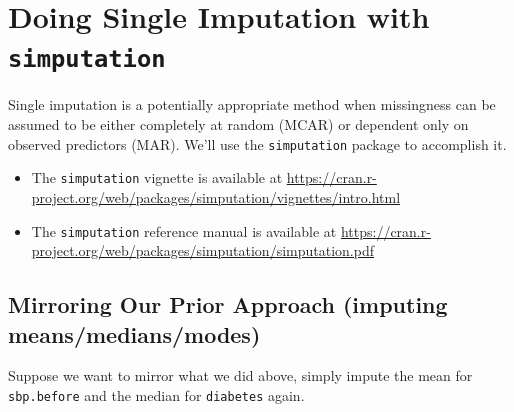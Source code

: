 \documentclass[]{book}
\newenvironment{Shaded}{\begin{snugshade}}{\end{snugshade}}
\newcommand{\KeywordTok}[1]{\textcolor[rgb]{0.13,0.29,0.53}{\textbf{#1}}}
\newcommand{\DataTypeTok}[1]{\textcolor[rgb]{0.13,0.29,0.53}{#1}}
\newcommand{\DecValTok}[1]{\textcolor[rgb]{0.00,0.00,0.81}{#1}}
\newcommand{\StringTok}[1]{\textcolor[rgb]{0.31,0.60,0.02}{#1}}
\newcommand{\OperatorTok}[1]{\textcolor[rgb]{0.81,0.36,0.00}{\textbf{#1}}}
\newcommand{\NormalTok}[1]{#1}
\providecommand{\tightlist}{%
  \setlength{\itemsep}{0pt}\setlength{\parskip}{0pt}}
\theoremstyle{definition}
\theoremstyle{definition}
\theoremstyle{definition}
\theoremstyle{remark}
\begin{document}
\section{\texorpdfstring{Doing Single Imputation with
\texttt{simputation}}{Doing Single Imputation with simputation}}\label{doing-single-imputation-with-simputation}

Single imputation is a potentially appropriate method when missingness
can be assumed to be either completely at random (MCAR) or dependent
only on observed predictors (MAR). We'll use the \texttt{simputation}
package to accomplish it.

\begin{itemize}
\tightlist
\item
  The \texttt{simputation} vignette is available at
  \url{https://cran.r-project.org/web/packages/simputation/vignettes/intro.html}
\item
  The \texttt{simputation} reference manual is available at
  \url{https://cran.r-project.org/web/packages/simputation/simputation.pdf}
\end{itemize}

\subsection{Mirroring Our Prior Approach (imputing
means/medians/modes)}\label{mirroring-our-prior-approach-imputing-meansmediansmodes}

Suppose we want to mirror what we did above, simply impute the mean for
\texttt{sbp.before} and the median for \texttt{diabetes} again.

\begin{Shaded}
\end{Shaded}
\end{document}
